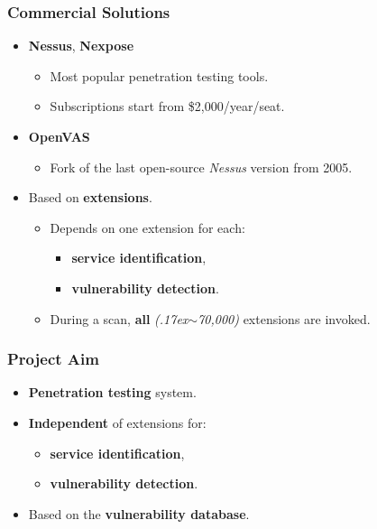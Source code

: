\documentclass[aspectratio=169,xcolor={usenames,dvipsnames}]{beamer}
\newcommand{\ispace}{\vspace{10pt}}
\begin{document}
\begin{frame}
	\frametitle{Commercial Solutions}
	
	\begin{itemize}
		\item \textbf{Nessus}, \textbf{Nexpose}
		\begin{itemize}
			\item Most popular penetration testing tools.
			\item Subscriptions start from \$2,000/year/seat. 
		\end{itemize}
		\item \textbf{OpenVAS}
		\begin{itemize}
			\item Fork of the last open-source \textit{Nessus} version from 2005.
		\end{itemize}
	\end{itemize}
	
	\ispace
	
	\begin{itemize}
		\item Based on \textbf{extensions}.
		\begin{itemize}
			\item Depends on one extension for each:
			\begin{itemize}
				\item \textbf{service identification},
				\item \textbf{vulnerability detection}.
			\end{itemize}
			\item During a scan, \textbf{all} \textit{({\raise.17ex\hbox{$\scriptstyle\sim$}}70,000)} extensions are invoked.
		\end{itemize}
	\end{itemize}
\end{frame}

\begin{frame}
	\frametitle{Project Aim}
	
	\begin{itemize}
		\item \textbf{Penetration testing} system.
		\item \textbf{Independent} of extensions for:
		\begin{itemize}
			\item \textbf{service identification},
			\item \textbf{vulnerability detection}.
		\end{itemize}
		\item Based on the \textbf{vulnerability database}.
	\end{itemize}
\end{frame}
\end{document}
